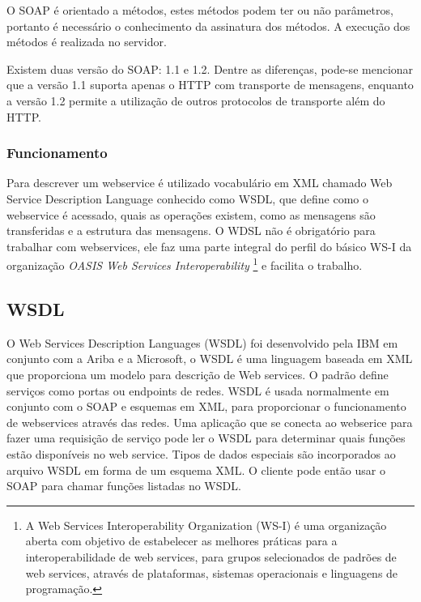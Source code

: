 \documentclass{acm_proc_article-sp}
\begin{document}
			O SOAP é orientado a métodos, estes métodos podem ter ou não parâmetros, portanto é necessário o conhecimento da assinatura dos métodos. A execução dos métodos é realizada no servidor.
		
			Existem duas versão do SOAP: 1.1 e 1.2. Dentre as diferenças, pode-se mencionar que a versão 1.1 suporta apenas o HTTP com transporte de mensagens, enquanto a versão 1.2 permite a utilização de outros protocolos de transporte além do HTTP. \cite{WEBSERVICESZEND}
		
		\subsubsection{Funcionamento}
		
			Para descrever um webservice é utilizado vocabulário em XML chamado Web Service Description Language conhecido como WSDL, que define como o webservice é acessado, quais as operações existem, como as mensagens são transferidas e a estrutura das mensagens. O WDSL não é obrigatório para trabalhar com webservices, ele faz uma parte integral do perfil do básico WS-I da organização \emph{OASIS Web Services Interoperability} \footnote{A Web Services Interoperability Organization (WS-I) é uma organização aberta com objetivo de estabelecer as melhores práticas para a interoperabilidade de web services, para grupos selecionados de padrões de web services, através de plataformas, sistemas operacionais e linguagens de programação.\cite{OASIS-WS-I-SITE}} e facilita o trabalho. 
		
		
	\subsection{WSDL}
		
		O Web Services Description Languages (WSDL) foi desenvolvido pela IBM em conjunto com a Ariba e a Microsoft, o WSDL é uma linguagem baseada em XML que proporciona um modelo para descrição de Web services. O padrão define serviços como portas ou endpoints de redes. WSDL é usada normalmente em conjunto com o SOAP e esquemas em XML, para proporcionar o funcionamento de webservices através das redes. Uma aplicação que se conecta ao webserice para fazer uma requisição de serviço pode ler o WSDL para determinar quais funções estão disponíveis no web service. Tipos de dados especiais são incorporados ao arquivo WSDL em forma de um esquema XML. O cliente pode então usar o SOAP para chamar funções listadas no WSDL.
		
\end{document}
